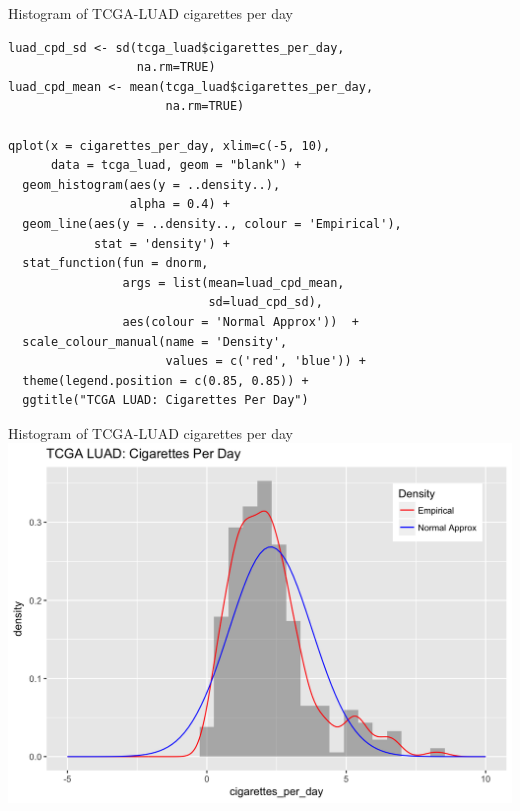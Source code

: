 \documentclass[12pt, t, xcolor=dvipsnames]{beamer}
\begin{document}
\begin{frame}[fragile]{Histogram of TCGA-LUAD cigarettes per day}
\begin{verbatim}
luad_cpd_sd <- sd(tcga_luad$cigarettes_per_day, 
                  na.rm=TRUE)
luad_cpd_mean <- mean(tcga_luad$cigarettes_per_day, 
                      na.rm=TRUE)

qplot(x = cigarettes_per_day, xlim=c(-5, 10), 
      data = tcga_luad, geom = "blank") +  
  geom_histogram(aes(y = ..density..), 
                 alpha = 0.4) +
  geom_line(aes(y = ..density.., colour = 'Empirical'),
            stat = 'density') +  
  stat_function(fun = dnorm, 
                args = list(mean=luad_cpd_mean, 
                            sd=luad_cpd_sd), 
                aes(colour = 'Normal Approx'))  + 
  scale_colour_manual(name = 'Density', 
                      values = c('red', 'blue')) + 
  theme(legend.position = c(0.85, 0.85)) + 
  ggtitle("TCGA LUAD: Cigarettes Per Day")
\end{verbatim}
\end{frame}

\begin{frame}{Histogram of TCGA-LUAD cigarettes per day}
\includegraphics[width=\textwidth, keepaspectratio]{histCpd}
\end{frame}
\end{document}
